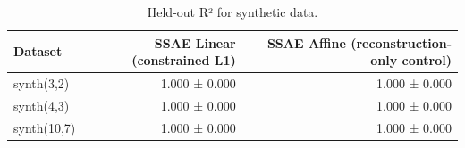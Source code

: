 \begin{table}[t]
\centering
\caption{Held-out R² for synthetic data.}
\label{tab:synthetic-r2}
\begin{tabular}{lrr}
\toprule
Dataset & SSAE Linear (constrained L1) & SSAE Affine (reconstruction-only control) \\
\midrule
synth(3,2) & 1.000 ± 0.000 & 1.000 ± 0.000 \\
synth(4,3) & 1.000 ± 0.000 & 1.000 ± 0.000 \\
synth(10,7) & 1.000 ± 0.000 & 1.000 ± 0.000 \\
\bottomrule
\end{tabular}
\end{table}
